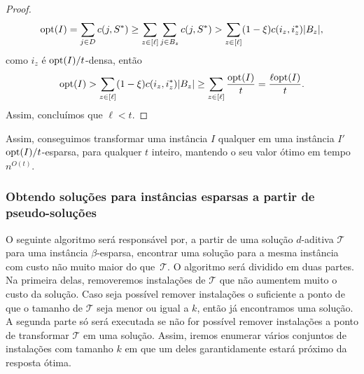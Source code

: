 \begin{proof}
    \begin{subequations}
        \begin{align*}
            \mathrm{opt}(I) = \sum_{j \in D} c(j,S^*) \geq \sum_{z \in [\ell]} \sum_{ j\in B_z} c(j,S^*) > \sum_{z \in [\ell]} (1 - \xi ) c(i_z,i_z^*) |B_z|,
        \end{align*}
    \end{subequations}
    como $i_z$ é $\mathrm{opt}(I)/t$-densa, então
    \begin{subequations}
        \begin{align*}
            \mathrm{opt}(I) > \sum_{z \in [\ell]} (1 - \xi ) c(i_z,i_z^*) |B_z| \geq \sum_{z \in [\ell]} \frac{\mathrm{opt}(I)}{t} = \frac{\ell \mathrm{opt}(I)}{t}.
        \end{align*}
    \end{subequations}
    Assim, concluímos que $\ell < t$.
\end{proof}

Assim, conseguimos transformar uma instância $I$ qualquer em uma instância $I'$ $\mathrm{opt}(I)/t$-esparsa, para qualquer $t$ inteiro, mantendo o seu valor ótimo em tempo $n^{O(t)}$.

\subsubsection{Obtendo soluções para instâncias esparsas a partir de pseudo-soluções}

O seguinte algoritmo será responsável por, a partir de uma solução $d$-aditiva $\mathcal{T}$ para uma instância $\beta$-esparsa, encontrar uma solução para a mesma instância com custo não muito maior do que~$\mathcal{T}$. O algoritmo será dividido em duas partes. Na primeira delas, removeremos instalações de $\mathcal{T}$ que não aumentem muito o custo da solução. Caso seja possível remover instalações o suficiente a ponto de que o tamanho de $\mathcal{T}$ seja menor ou igual a $k$, então já encontramos uma solução. A segunda parte só será executada se não for possível remover instalações a ponto de transformar $\mathcal{T}$ em uma solução. Assim, iremos enumerar vários conjuntos de instalações com tamanho $k$ em que um deles garantidamente estará próximo da resposta ótima.

